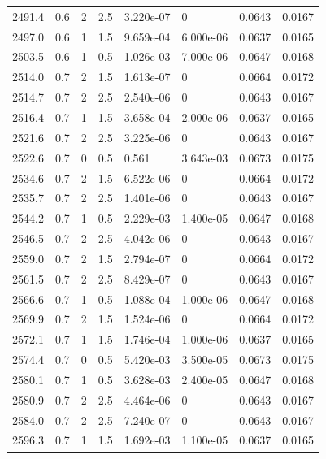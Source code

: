 \documentclass[preview]{standalone}
\begin{document}
{{{{{{{\begin{tabular}{L{1.2cm}C{1.2cm} C{0.3cm}C{0.5cm} C{1.4cm}C{1.4cm} C{1.4cm}C{1.4cm}}
  2491.4  &   0.6  & 2     & 2.5 &  3.220e-07  & 0  & 0.0643 &  0.0167   \\ 
  2497.0  &   0.6  & 1     & 1.5 &  9.659e-04  & 6.000e-06  & 0.0637 &  0.0165   \\ 
  2503.5  &   0.6  & 1     & 0.5 &  1.026e-03  & 7.000e-06  & 0.0647 &  0.0168   \\ 
  2514.0  &   0.7  & 2     & 1.5 &  1.613e-07  & 0  & 0.0664 &  0.0172   \\ 
  2514.7  &   0.7  & 2     & 2.5 &  2.540e-06  & 0  & 0.0643 &  0.0167   \\ 
  2516.4  &   0.7  & 1     & 1.5 &  3.658e-04  & 2.000e-06  & 0.0637 &  0.0165   \\ 
  2521.6  &   0.7  & 2     & 2.5 &  3.225e-06  & 0  & 0.0643 &  0.0167   \\ 
  2522.6  &   0.7  & 0     & 0.5 &  0.561  & 3.643e-03  & 0.0673 &  0.0175   \\ 
  2534.6  &   0.7  & 2     & 1.5 &  6.522e-06  & 0  & 0.0664 &  0.0172   \\ 
  2535.7  &   0.7  & 2     & 2.5 &  1.401e-06  & 0  & 0.0643 &  0.0167   \\ 
  2544.2  &   0.7  & 1     & 0.5 &  2.229e-03  & 1.400e-05  & 0.0647 &  0.0168   \\ 
  2546.5  &   0.7  & 2     & 2.5 &  4.042e-06  & 0  & 0.0643 &  0.0167   \\ 
  2559.0  &   0.7  & 2     & 1.5 &  2.794e-07  & 0  & 0.0664 &  0.0172   \\ 
  2561.5  &   0.7  & 2     & 2.5 &  8.429e-07  & 0  & 0.0643 &  0.0167   \\ 
  2566.6  &   0.7  & 1     & 0.5 &  1.088e-04  & 1.000e-06  & 0.0647 &  0.0168   \\ 
  2569.9  &   0.7  & 2     & 1.5 &  1.524e-06  & 0  & 0.0664 &  0.0172   \\ 
  2572.1  &   0.7  & 1     & 1.5 &  1.746e-04  & 1.000e-06  & 0.0637 &  0.0165   \\ 
  2574.4  &   0.7  & 0     & 0.5 &  5.420e-03  & 3.500e-05  & 0.0673 &  0.0175   \\ 
  2580.1  &   0.7  & 1     & 0.5 &  3.628e-03  & 2.400e-05  & 0.0647 &  0.0168   \\ 
  2580.9  &   0.7  & 2     & 2.5 &  4.464e-06  & 0  & 0.0643 &  0.0167   \\ 
  2584.0  &   0.7  & 2     & 2.5 &  7.240e-07  & 0  & 0.0643 &  0.0167   \\ 
  2596.3  &   0.7  & 1     & 1.5 &  1.692e-03  & 1.100e-05  & 0.0637 &  0.0165   \\ 

\end{tabular}}}}}}}}
\end{document}
